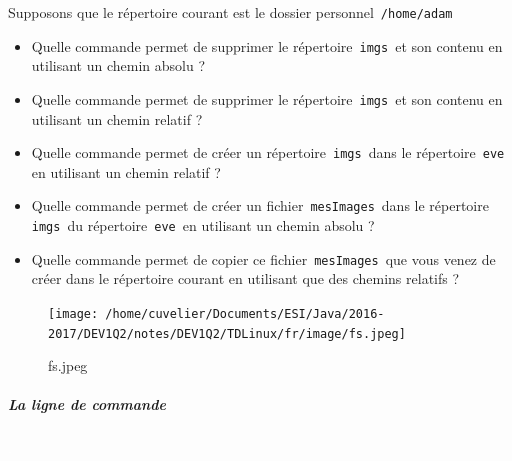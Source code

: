 \documentclass[11pt,a4paper]{article}
\begin{document}
							Supposons que le r\'epertoire courant est le dossier personnel \,\verb|/home/adam|\,
					\begin{itemize}
				
			\item 
										Quelle commande permet de supprimer le r\'epertoire \,\verb|imgs|\, et son contenu en utilisant un chemin absolu ?
										 \textcolor{gray}{\underline{\hspace*{16em}}} 
			\item 
										Quelle commande permet de supprimer le r\'epertoire \,\verb|imgs|\, et son contenu en utilisant un chemin relatif ?
										 \textcolor{gray}{\underline{\hspace*{10em}}} 
			\item 
										Quelle commande permet de cr\'eer un r\'epertoire \,\verb|imgs|\, 
										dans le r\'epertoire \,\verb|eve|\, en utilisant un chemin relatif ?
										 \textcolor{gray}{\underline{\hspace*{16em}}} 
			\item 
										Quelle commande permet de cr\'eer un fichier \,\verb|mesImages|\, 
										dans le r\'epertoire \,\verb|imgs|\, du r\'epertoire \,\verb|eve|\, en utilisant un chemin absolu ?
										 \textcolor{gray}{\underline{\hspace*{16em}}} 
			\item 
										Quelle commande permet de copier ce fichier \,\verb|mesImages|\, 
										que vous venez de cr\'eer dans le r\'epertoire courant en utilisant que des chemins relatifs ?
										 \textcolor{gray}{\underline{\hspace*{16em}}} 
					\end{itemize}
				\begin{figure}[hbt]
				    \begin{center}
					\texttt{[image: /home/cuvelier/Documents/ESI/Java/2016-2017/DEV1Q2/notes/DEV1Q2/TDLinux/fr/image/fs.jpeg]}
						\end{center}
                
                    \caption[fs.jpeg]{fs.jpeg}
                \end{figure}
                    
            \par
        
			
		\subparagraph{La ligne de commande} 
		
                \textcolor{white}{.} \par
            
\end{document}
